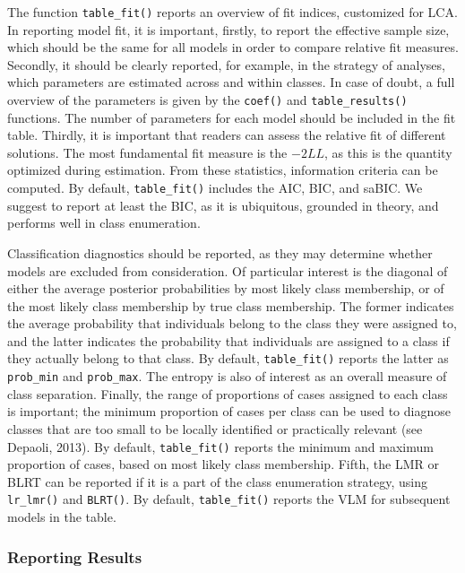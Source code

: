\documentclass[
  ,man,floatsintext]{apa6}
\begin{document}
The function \texttt{table\_fit()} reports an overview of fit indices, customized for LCA.
In reporting model fit, it is important, firstly, to report the effective sample size, which should be the same for all models in order to compare relative fit measures.
Secondly, it should be clearly reported,
for example, in the strategy of analyses,
which parameters are estimated across and within classes.
In case of doubt, a full overview of the parameters is given by the \texttt{coef()} and \texttt{table\_results()} functions.
The number of parameters for each model should be included in the fit table.
Thirdly, it is important that readers can assess the relative fit of different solutions.
The most fundamental fit measure is the \(-2LL\),
as this is the quantity optimized during estimation.
From these statistics, information criteria can be computed.
By default, \texttt{table\_fit()} includes the AIC, BIC, and saBIC.
We suggest to report at least the BIC, as it is ubiquitous, grounded in theory, and performs well in class enumeration.

Classification diagnostics should be reported,
as they may determine whether models are excluded from consideration.
Of particular interest is the diagonal of either the average posterior probabilities by most likely class membership,
or of the most likely class membership by true class membership.
The former indicates the average probability that individuals belong to the class they were assigned to,
and the latter indicates the probability that individuals are assigned to a class if they actually belong to that class.
By default, \texttt{table\_fit()} reports the latter as \texttt{prob\_min} and \texttt{prob\_max}.
The entropy is also of interest as an overall measure of class separation.
Finally, the range of proportions of cases assigned to each class is important;
the minimum proportion of cases per class can be used to diagnose classes that are too small to be locally identified or practically relevant (see Depaoli, 2013).
By default, \texttt{table\_fit()} reports the minimum and maximum proportion of cases,
based on most likely class membership.
Fifth, the LMR or BLRT can be reported if it is a part of the class enumeration strategy, using \texttt{lr\_lmr()} and \texttt{BLRT()}.
By default, \texttt{table\_fit()} reports the VLM for subsequent models in the table.

\hypertarget{reporting-results}{%
\subsubsection{Reporting Results}\label{reporting-results}}
\end{document}
